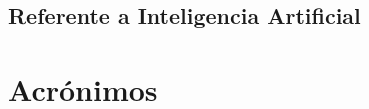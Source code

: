 \begin{enumerate}
		\newpage
		
		
	\subsection{Referente a Inteligencia Artificial}
		
		
		
\end{enumerate}




\newpage

\section{Acrónimos}
\label{sec:acronimos}

\begin{description}
	

\end{description}
